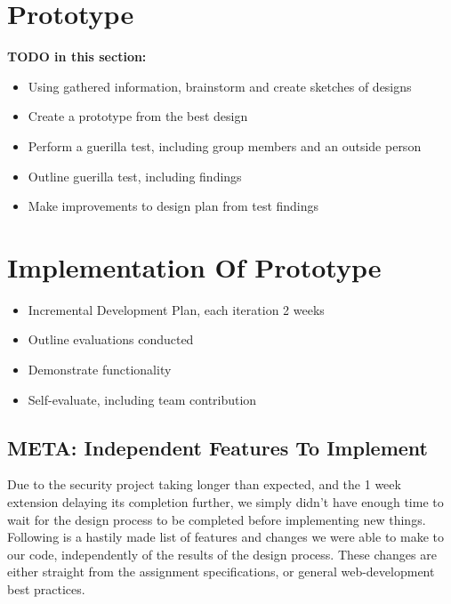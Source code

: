 \documentclass[12pt]{article}
\begin{document}
\section[Prototype]{Prototype}

\textbf{TODO in this section:}
\begin{itemize}
    \item Using gathered information, brainstorm and create sketches of designs
    \item Create a prototype from the best design
    \item Perform a guerilla test, including group members and an outside person
    \item Outline guerilla test, including findings
    \item Make improvements to design plan from test findings
\end{itemize}

\section[Implementation]{Implementation Of Prototype}

\begin{itemize}
    \item Incremental Development Plan, each iteration 2 weeks
    \item Outline evaluations conducted
    \item Demonstrate functionality
    \item Self-evaluate, including team contribution
\end{itemize}

\subsection{META: Independent Features To Implement}

Due to the security project taking longer than expected, and the 1 week extension delaying its completion further, we simply didn't have enough time to wait for the design process to be completed before implementing new things. Following is a hastily made list of features and changes we were able to make to our code, independently of the results of the design process. These changes are either straight from the assignment specifications, or general web-development best practices.
\end{document}
